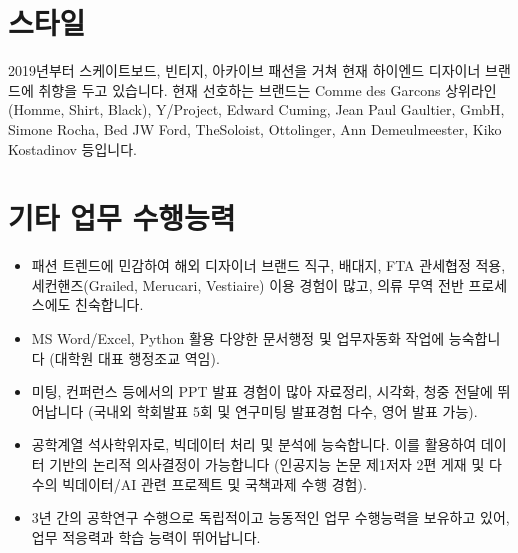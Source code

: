 \section*{스타일}
2019년부터 스케이트보드, 빈티지, 아카이브 패션을 거쳐 현재 하이엔드 디자이너 브랜드에 취향을 두고 있습니다.
현재 선호하는 브랜드는 Comme des Garcons 상위라인(Homme, Shirt, Black), Y/Project, Edward Cuming, Jean Paul Gaultier, GmbH, Simone Rocha, Bed JW Ford, TheSoloist, Ottolinger, Ann Demeulmeester, Kiko Kostadinov 등입니다.

\section*{기타 업무 수행능력}
\begin{itemize}
    \item 패션 트렌드에 민감하여 해외 디자이너 브랜드 직구, 배대지, FTA 관세협정 적용, 세컨핸즈(Grailed, Merucari, Vestiaire) 이용 경험이 많고, 의류 무역 전반 프로세스에도 친숙합니다.
    \item MS Word/Excel, Python 활용 다양한 문서행정 및 업무자동화 작업에 능숙합니다 (대학원 대표 행정조교 역임).
    \item 미팅, 컨퍼런스 등에서의 PPT 발표 경험이 많아 자료정리, 시각화, 청중 전달에 뛰어납니다  (국내외 학회발표 5회 및 연구미팅 발표경험 다수, 영어 발표 가능).
    \item 공학계열 석사학위자로, 빅데이터 처리 및 분석에 능숙합니다. 이를 활용하여 데이터 기반의 논리적 의사결정이 가능합니다 (인공지능 논문 제1저자 2편 게재 및 다수의 빅데이터/AI 관련 프로젝트 및 국책과제 수행 경험).
    \item 3년 간의 공학연구 수행으로 독립적이고 능동적인 업무 수행능력을 보유하고 있어, 업무 적응력과 학습 능력이 뛰어납니다.
\end{itemize}